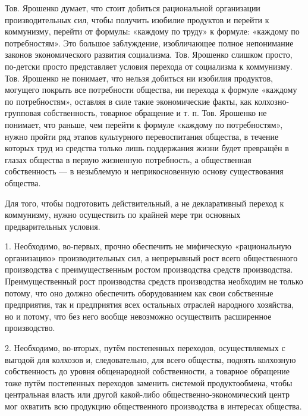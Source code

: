 \documentclass[12pt, a4paper, openany]{book}
\begin{document}
Тов. Ярошенко думает, что стоит добиться рациональной организации производительных сил, чтобы получить изобилие продуктов и перейти к коммунизму, перейти от формулы: «каждому по труду» к формуле: «каждому по потребностям». Это большое заблуждение, изобличающее полное непонимание законов экономического развития социализма. Тов. Ярошенко слишком просто, по-детски просто представляет условия перехода от социализма к коммунизму. Тов. Ярошенко не понимает, что нельзя добиться ни изобилия продуктов, могущего покрыть все потребности общества, ни перехода к формуле «каждому по потребностям», оставляя в силе такие экономические факты, как колхозно-групповая собственность, товарное обращение и т. п. Тов. Ярошенко не понимает, что раньше, чем перейти к формуле «каждому по потребностям», нужно пройти ряд этапов культурного перевоспитания общества, в течение которых труд из средства только лишь поддержания жизни будет превращён в глазах общества в первую жизненную потребность, а общественная собственность — в незыблемую и неприкосновенную основу существования общества.

Для того, чтобы подготовить действительный, а не декларативный переход к коммунизму, нужно осуществить по крайней мере три основных предварительных условия.

1. Необходимо, во-первых, прочно обеспечить не мифическую «рациональную организацию» производительных сил, а непрерывный рост всего общественного производства с преимущественным ростом производства средств производства. Преимущественный рост производства средств производства необходим не только потому, что оно должно обеспечить оборудованием как свои собственные предприятия, так и предприятия всех остальных отраслей народного хозяйства, но и потому, что без него вообще невозможно осуществить расширенное производство.

2. Необходимо, во-вторых, путём постепенных переходов, осуществляемых с выгодой для колхозов и, следовательно, для всего общества, поднять колхозную собственность до уровня общенародной собственности, а товарное обращение тоже путём постепенных переходов заменить системой продуктообмена, чтобы центральная власть или другой какой-либо общественно-экономический центр мог охватить всю продукцию общественного производства в интересах общества.
\end{document}
